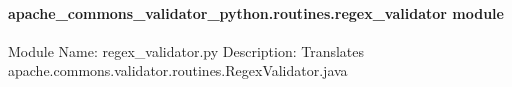 \documentclass[letterpaper,10pt,english]{sphinxmanual}
\begin{document}
\paragraph{apache\_commons\_validator\_python.routines.regex\_validator module}
\label{\detokenize{apache_commons_validator_python.routines:module-apache_commons_validator_python.routines.regex_validator}}\label{\detokenize{apache_commons_validator_python.routines:apache-commons-validator-python-routines-regex-validator-module}}
\sphinxAtStartPar
Module Name: regex\_validator.py
Description: Translates apache.commons.validator.routines.RegexValidator.java
\end{document}

